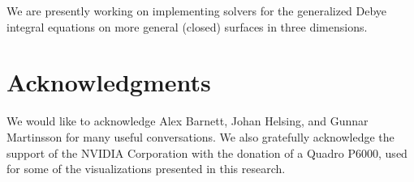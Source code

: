 \documentclass[11pt]{article}
\numberwithin{equation}{section}
\begin{document}
We are presently working on 
implementing solvers for
the generalized Debye integral equations on more general 
(closed) surfaces in three dimensions.


\section*{Acknowledgments}
We would like to acknowledge Alex Barnett, Johan Helsing, and Gunnar
Martinsson for many useful conversations.  We also gratefully
acknowledge the support of the NVIDIA Corporation with the donation of
a Quadro P6000, used for some of the visualizations presented in this
research.

%


\end{document}
